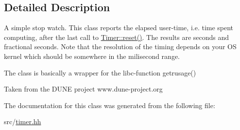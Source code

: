 \subsection{Detailed Description}
A simple stop watch. This class reports the elapsed user-\/time, i.e. time spent computing, after the last call to \hyperlink{classhdnum_1_1Timer_ad9169c761853bd68249ce1a5d4af1511}{Timer::reset()}. The results are seconds and fractional seconds. Note that the resolution of the timing depends on your OS kernel which should be somewhere in the milisecond range.

The class is basically a wrapper for the libc-\/function getrusage()

Taken from the DUNE project www.dune-\/project.org 

The documentation for this class was generated from the following file:\begin{DoxyCompactItemize}
\item 
src/\hyperlink{timer_8hh}{timer.hh}\end{DoxyCompactItemize}
